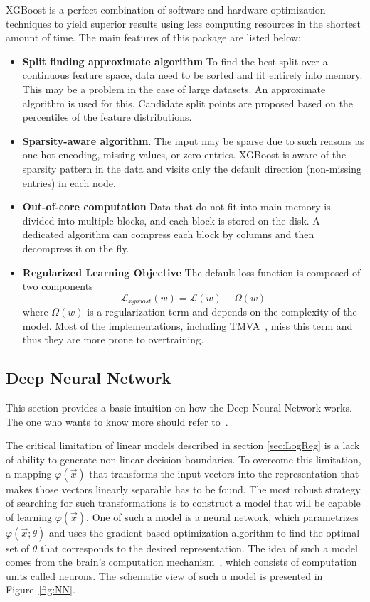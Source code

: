 XGBoost is a perfect combination of software and hardware optimization techniques to yield superior results using less computing resources in the shortest amount of time. The main features of this package are listed below: 
\begin{itemize}
    \item \textbf{Split finding approximate algorithm} To find the best split over a continuous feature space, data need to be sorted and fit entirely into memory. This may be a problem in the case of large datasets.
    An approximate algorithm is used for this. Candidate split points are proposed based on the percentiles of the feature distributions.
    \item  \textbf{Sparsity-aware algorithm}. The input may be sparse due to such reasons as one-hot encoding, missing values, or zero entries. XGBoost is aware of the sparsity pattern in the data and visits only the default direction (non-missing entries) in each node.
    \item  \textbf{Out-of-core computation} 
    Data that do not fit into main memory is divided into multiple blocks, and each block is stored on the disk. A dedicated algorithm can compress each block by columns and then decompress it on the fly.
    \item \textbf{Regularized Learning Objective} The default loss function is composed of two components 
    \begin{equation}
        \mathcal{L}_{xgboost}(w) = \mathcal{L}(w) + \Omega(w)
    \end{equation}
    where $\Omega(w)$ is a  regularization term and depends on the complexity of the model. Most of the implementations, including TMVA~\cite{TMVA}, miss this term and thus they are more prone to overtraining. 
\end{itemize}


\subsection{Deep Neural Network}
\label{sec:DNN}
This section provides a basic intuition on how the Deep Neural Network works. The one who wants to know more should refer to~\cite{DLBook}.  

The critical limitation of linear models described in section \ref{sec:LogReg} is a lack of ability to generate non-linear decision boundaries. To overcome this limitation, a mapping $\varphi(\vec{x})$ that transforms the input vectors into the representation that makes those vectors linearly separable has to be found. The most robust strategy of searching for such transformations is to construct a model that will be capable of learning $\varphi(\vec{x})$. One of such a model is a neural network, which parametrizes $\varphi(\vec{x};\theta)$ and uses the gradient-based optimization algorithm to find the optimal set of $\theta$ that corresponds to the desired representation. The idea of such a model comes from the brain's computation mechanism~\cite{NN_brain}, which consists of computation units called neurons. The schematic view of such a model is presented in Figure~\ref{fig:NN}. 

